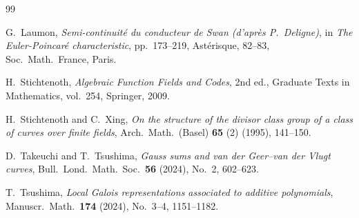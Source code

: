 \documentclass[12pt,a4paper]{amsart}
\theoremstyle{definition}
\theoremstyle{remark}
\begin{document}
\begin{thebibliography}{99}

G.\ Laumon, 
\textit{Semi-continuit\'e{} du conducteur de Swan (d'apr\`es P.\ Deligne)}, in {\it The Euler-Poincar\'e{} characteristic}, pp.\ 173--219, Ast\'erisque, 82--83, Soc.\ Math.\ France, Paris. 


H.\ Stichtenoth,
\textit{Algebraic Function Fields and Codes},
2nd ed., Graduate Texts in Mathematics, vol.\ 254,
Springer, 2009.

H.\ Stichtenoth and C.\ Xing, 
\textit{On the structure of the divisor class group of a class of curves over finite fields},
Arch.\ Math.\ (Basel) \textbf{65} (2) (1995), 141--150. 

D.\ Takeuchi and T.\ Tsushima,
\textit{Gauss sums and van der Geer--van der Vlugt curves},
Bull.\ Lond.\ Math.\ Soc.\ \textbf{56} (2024), No.~2, 602--623.

T.\  Tsushima, 
\textit{Local Galois representations associated to additive
polynomials}, 
Manuscr.\ Math.\ \textbf{174} (2024), No.~3--4, 1151--1182. 

\end{thebibliography}
\end{document}

